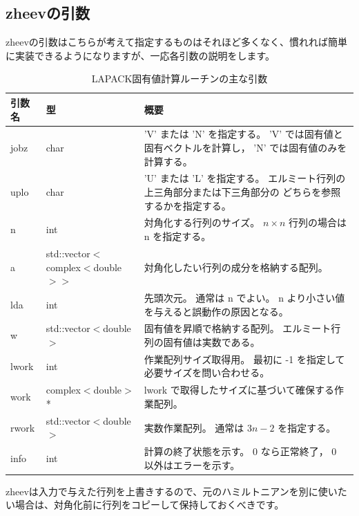 \documentclass[12pt]{jreport}
\begin{document}
\subsection{zheevの引数}
zheevの引数はこちらが考えて指定するものはそれほど多くなく、慣れれば簡単に実装できるようになりますが、一応各引数の説明をします。
% 
\begin{table}[H]
\centering
\caption{LAPACK固有値計算ルーチンの主な引数}
\renewcommand{\arraystretch}{1.3}

\begin{tabularx}{\textwidth}{|l|l|X|}
\hline
\rowcolor{tableblue!20}
\textbf{引数名} & \textbf{型} & \textbf{概要} \\
\hline

jobz & char &
'V' または 'N' を指定する。
'V' では固有値と固有ベクトルを計算し，
'N' では固有値のみを計算する。 \\
\hline

uplo & char &
'U' または 'L' を指定する。
エルミート行列の上三角部分または下三角部分の
どちらを参照するかを指定する。 \\
\hline

n & int &
対角化する行列のサイズ。
$n\times n$ 行列の場合は n を指定する。 \\
\hline

a & std::vector$<$complex$<$double$>>$ &
対角化したい行列の成分を格納する配列。 \\
\hline

lda & int &
先頭次元。
通常は n でよい。
n より小さい値を与えると誤動作の原因となる。 \\
\hline

w & std::vector$<$double$>$ &
固有値を昇順で格納する配列。
エルミート行列の固有値は実数である。 \\
\hline

lwork & int &
作業配列サイズ取得用。
最初に -1 を指定して必要サイズを問い合わせる。 \\
\hline

work & complex$<$double$>$* &
lwork で取得したサイズに基づいて確保する作業配列。 \\
\hline

rwork & std::vector$<$double$>$ &
実数作業配列。
通常は $3n-2$ を指定する。 \\
\hline

info & int &
計算の終了状態を示す。
0 なら正常終了，
0 以外はエラーを示す。 \\
\hline

\end{tabularx}
\end{table}
zheevは入力で与えた行列を上書きするので、元のハミルトニアンを別に使いたい場合は、対角化前に行列をコピーして保持しておくべきです。
\end{document}
